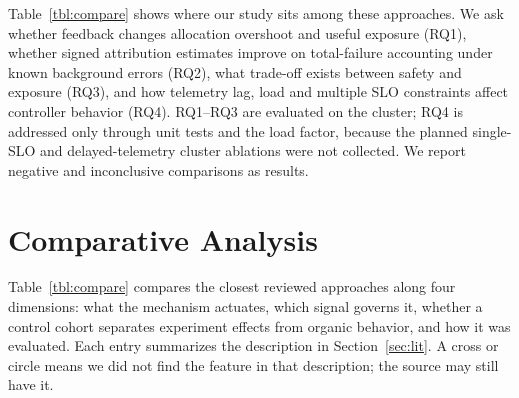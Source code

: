 \documentclass[a4paper,fleqn,11pt]{cas-dc}
\begin{document}
Table~\ref{tbl:compare} shows where our study sits among these approaches. We ask whether feedback changes allocation overshoot and useful exposure (RQ1), whether signed attribution estimates improve on total-failure accounting under known background errors (RQ2), what trade-off exists between safety and exposure (RQ3), and how telemetry lag, load and multiple SLO constraints affect controller behavior (RQ4). RQ1--RQ3 are evaluated on the cluster; RQ4 is addressed only through unit tests and the load factor, because the planned single-SLO and delayed-telemetry cluster ablations were not collected. We report negative and inconclusive comparisons as results.

\section{Comparative Analysis}\label{sec:compare}

Table~\ref{tbl:compare} compares the closest reviewed approaches along four dimensions: what the mechanism actuates, which signal governs it, whether a control cohort separates experiment effects from organic behavior, and how it was evaluated. Each entry summarizes the description in Section~\ref{sec:lit}. A cross or circle means we did not find the feature in that description; the source may still have it.
\end{document}
